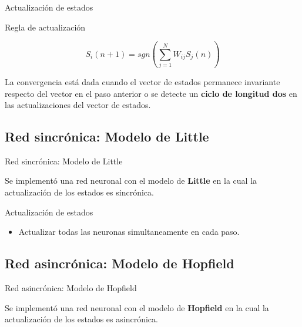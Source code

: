 \documentclass{beamer}
\begin{document}
\begin{frame}{Actualización de estados}

\begin{block}{Regla de actualización}

\[
S_i(n+1) = sgn\left(\sum_{j=1}^{N}{W_{ij}S_j(n)}\right)
\]

\end{block}
\vspace{10px}
\par La convergencia está dada cuando el vector de estados permanece invariante respecto del vector en el paso anterior o se detecte un \textbf{ciclo de longitud dos} en las actualizaciones del vector de estados.\\

\end{frame}

\subsection{Red sincrónica: Modelo de Little}
\begin{frame}{Red sincrónica: Modelo de Little}

\par Se implementó una red neuronal con el modelo de \textbf{Little} en la cual la actualización de los estados es sincrónica.

\end{frame}

\begin{frame}{Actualización de estados}

\begin{itemize}
\item Actualizar todas las neuronas simultaneamente en cada paso.
\end{itemize}

\end{frame}

\subsection{Red asincrónica: Modelo de Hopfield}
\begin{frame}{Red asincrónica: Modelo de Hopfield}

\par Se implementó una red neuronal con el modelo de \textbf{Hopfield} en la cual la actualización de los estados es asincrónica.

\end{frame}
\end{document}
